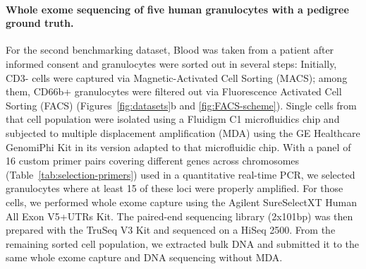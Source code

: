\documentclass[authoryear,preprint,11pt]{scrartcl}
\begin{document}
\paragraph{Whole exome sequencing of five human granulocytes with a pedigree ground truth.}
For the second benchmarking dataset, Blood was taken from a patient after informed consent and granulocytes were sorted out in several steps: Initially, CD3- cells were captured via Magnetic-Activated Cell Sorting (MACS); among them, CD66b+ granulocytes were filtered out via Fluorescence Activated Cell Sorting (FACS) (Figures~\ref{fig:datasets}b and \ref{fig:FACS-scheme}).
Single cells from that cell population were isolated using a Fluidigm C1 microfluidics chip and subjected to multiple displacement amplification (MDA) using the GE Healthcare GenomiPhi Kit in its version adapted to that microfluidic chip.
With a panel of 16 custom primer pairs covering different genes across chromosomes (Table~\ref{tab:selection-primers}) used in a quantitative real-time PCR, we selected granulocytes where at least 15 of these loci were properly amplified.
For those cells, we performed whole exome capture using the Agilent SureSelectXT Human All Exon V5+UTRs Kit.
The paired-end sequencing library (2x101bp) was then prepared with the TruSeq V3 Kit and sequenced on a HiSeq 2500.
From the remaining sorted cell population, we extracted bulk DNA and submitted it to the same whole exome capture and DNA sequencing without MDA.\\
\end{document}
